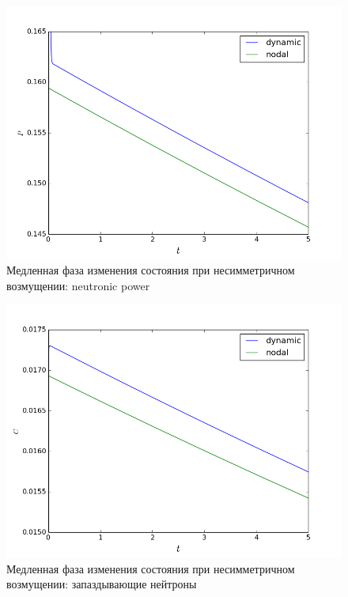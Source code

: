 \documentclass[authoryear]{elsarticle}
\begin{document}
\begin{figure}[!h]
  \begin{center}
    \includegraphics[width=0.9\linewidth] {17.png}
	\caption{Медленная фаза изменения состояния при несимметричном возмущении: neutronic power}
	\label{fig:17}
  \end{center}
\end{figure} 

\begin{figure}[!h]
  \begin{center}
    \includegraphics[width=0.9\linewidth] {18.png}
	\caption{Медленная фаза изменения состояния при несимметричном возмущении: запаздывающие нейтроны}
	\label{fig:18}
  \end{center}
\end{figure} 

\clearpage
\end{document}
